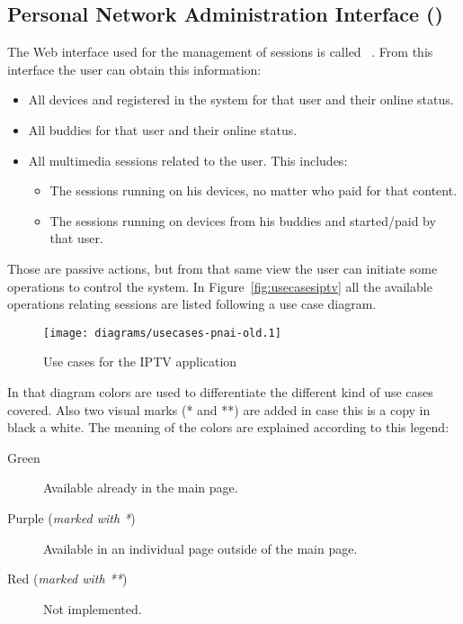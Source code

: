 \subsection{Personal Network Administration Interface ()} %
\label{sub:pnai}

The Web interface used for the management of sessions is called ~\cite{SIV08A}. From this interface the user can obtain this information:

\begin{itemize}
  \item All devices and registered in the system for that user and their online status.
  \item All buddies for that user and their online status.
  \item All multimedia sessions related to the user. This includes:
  \begin{itemize}
    \item The sessions running on his devices, no matter who paid for that content.
    \item The sessions running on devices from his buddies and started/paid by that user.
  \end{itemize}
\end{itemize}

Those are passive actions, but from that same view the user can initiate some operations to control the system.
In Figure~\vref{fig:usecasesiptv} all the available operations relating sessions are listed following a use case diagram.

\begin{figure}[htbp]
  \centering
    \texttt{[image: diagrams/usecases-pnai-old.1]}
  \caption{Use cases for the IPTV application}
  \label{fig:usecasesiptv}
\end{figure}

In that diagram colors are used to differentiate the different kind of use cases covered. Also two visual marks (* and **) are added in case this is a copy in black a white. The meaning of the colors are explained according to this legend:

\begin{description}
  \item[Green] Available already in the main  page.
  \item[Purple (\emph{marked with *})] Available in an individual page outside of the main  page.
  \item[Red (\emph{marked with **})] Not implemented.
\end{description}

